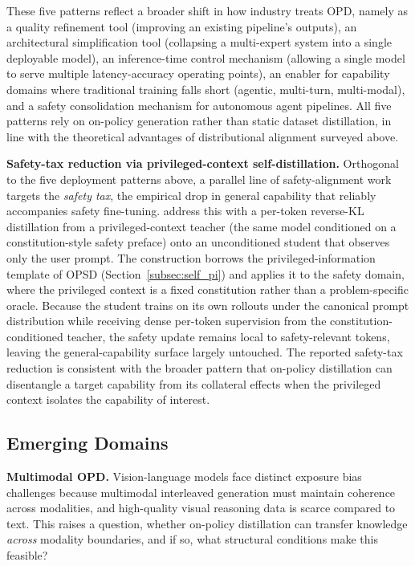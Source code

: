 \documentclass{article} %
\begin{document}
These five patterns reflect a broader shift in how industry treats OPD, namely as a quality refinement tool (improving an existing pipeline's outputs), an architectural simplification tool (collapsing a multi-expert system into a single deployable model), an inference-time control mechanism (allowing a single model to serve multiple latency-accuracy operating points), an enabler for capability domains where traditional training falls short (agentic, multi-turn, multi-modal), and a safety consolidation mechanism for autonomous agent pipelines. All five patterns rely on on-policy generation rather than static dataset distillation, in line with the theoretical advantages of distributional alignment surveyed above.

\textbf{Safety-tax reduction via privileged-context self-distillation.} Orthogonal to the five deployment patterns above, a parallel line of safety-alignment work targets the \emph{safety tax}, the empirical drop in general capability that reliably accompanies safety fine-tuning. \citet{2605.15239} address this with a per-token reverse-KL distillation from a privileged-context teacher (the same model conditioned on a constitution-style safety preface) onto an unconditioned student that observes only the user prompt. The construction borrows the privileged-information template of OPSD (Section~\ref{subsec:self_pi}) and applies it to the safety domain, where the privileged context is a fixed constitution rather than a problem-specific oracle. Because the student trains on its own rollouts under the canonical prompt distribution while receiving dense per-token supervision from the constitution-conditioned teacher, the safety update remains local to safety-relevant tokens, leaving the general-capability surface largely untouched. The reported safety-tax reduction is consistent with the broader pattern that on-policy distillation can disentangle a target capability from its collateral effects when the privileged context isolates the capability of interest.

\subsection{Emerging Domains}
\label{subsec:emerging}

\textbf{Multimodal OPD.} Vision-language models face distinct exposure bias challenges because multimodal interleaved generation must maintain coherence across modalities, and high-quality visual reasoning data is scarce compared to text. This raises a question, whether on-policy distillation can transfer knowledge \emph{across} modality boundaries, and if so, what structural conditions make this feasible?
\end{document}
